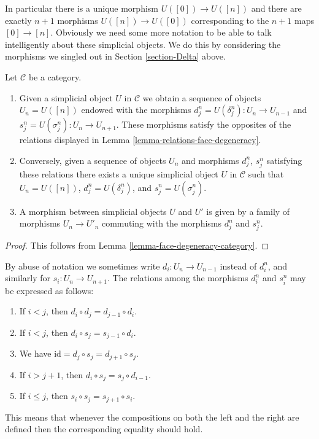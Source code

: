 \medskip\noindent
In particular there is a unique morphism $U([0]) \to U([n])$ and there are
exactly $n + 1$ morphisms $U([n]) \to U([0])$ corresponding to
the $n + 1$ maps $[0] \to [n]$. Obviously we need some more notation
to be able to talk
intelligently about these simplicial objects. We do this by considering
the morphisms we singled out in Section \ref{section-Delta} above.

\begin{lemma}
\label{lemma-characterize-simplicial-object}
Let $\mathcal{C}$ be a category.
\begin{enumerate}
\item Given a simplicial object $U$ in $\mathcal{C}$
we obtain a sequence of objects $U_n = U([n])$ endowed
with the morphisms $d^n_j = U(\delta^n_j) : U_n \to U_{n-1}$ and
$s^n_j = U(\sigma^n_j) : U_n \to U_{n + 1}$. These morphisms
satisfy the opposites of the relations displayed in
Lemma \ref{lemma-relations-face-degeneracy}.
\item Conversely, given a sequence of objects $U_n$ and morphisms
$d^n_j$, $s^n_j$ satisfying these relations there exists a unique
simplicial object $U$ in $\mathcal{C}$ such that $U_n = U([n])$,
$d^n_j = U(\delta^n_j)$, and $s^n_j = U(\sigma^n_j)$.
\item A morphism between simplicial objects $U$ and $U'$
is given by a family of morphisms $U_n \to U'_n$ commuting
with the morphisms $d^n_j$ and $s^n_j$.
\end{enumerate}
\end{lemma}

\begin{proof}
This follows from Lemma \ref{lemma-face-degeneracy-category}.
\end{proof}

\begin{remark}
\label{remark-relations}
By abuse of notation we sometimes write $d_i : U_n \to U_{n - 1}$
instead of $d^n_i$, and similarly for $s_i : U_n \to U_{n + 1}$.
The relations among the morphisms $d^n_i$ and $s^n_i$
may be expressed as follows:
\begin{enumerate}
\item If $i < j$, then $d_i \circ d_j = d_{j - 1} \circ d_i$.
\item If $i < j$, then $d_i \circ s_j = s_{j - 1} \circ d_i$.
\item We have $\text{id} = d_j \circ s_j = d_{j + 1} \circ s_j$.
\item If $i > j + 1$, then $d_i \circ s_j = s_j \circ d_{i - 1}$.
\item If $i \leq j$, then $s_i \circ s_j = s_{j + 1} \circ s_i$.
\end{enumerate}
This means that whenever the compositions on both the left and the
right are defined then the corresponding equality should hold.
\end{remark}

